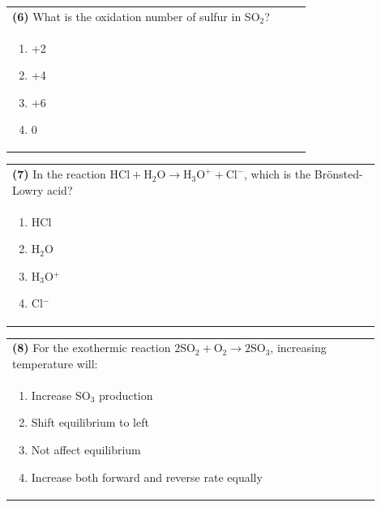 \documentclass{article}
\begin{document}
\noindent\begin{tabular}{|p{0.9\linewidth}|}
\hline
\textbf{(6)} What is the oxidation number of sulfur in SO$_2$?\\[0.2cm]
\begin{minipage}[t]{0.85\linewidth}
\begin{enumerate}[label=\alph*.]
\item +2
\item +4
\item +6
\item 0
\end{enumerate}
\end{minipage}\\[0.2cm]
\hline
\end{tabular}

\noindent\begin{tabular}{|p{0.9\linewidth}|}
\hline
\textbf{(7)} In the reaction $\text{HCl} + \text{H}_2\text{O} \rightarrow \text{H}_3\text{O}^+ + \text{Cl}^-$, which is the Brönsted-Lowry acid?\\[0.2cm]
\begin{minipage}[t]{0.85\linewidth}
\begin{enumerate}[label=\alph*.]
\item HCl
\item H$_2$O
\item H$_3$O$^+$
\item Cl$^-$
\end{enumerate}
\end{minipage}\\[0.2cm]
\hline
\end{tabular}

\noindent\begin{tabular}{|p{0.9\linewidth}|}
\hline
\textbf{(8)} For the exothermic reaction $2\text{SO}_2 + \text{O}_2 \rightarrow 2\text{SO}_3$, increasing temperature will: \\[0.2cm]
\begin{minipage}[t]{0.85\linewidth}
\begin{enumerate}[label=\alph*.]
\item Increase SO$_3$ production
\item Shift equilibrium to left
\item Not affect equilibrium
\item Increase both forward and reverse rate equally
\end{enumerate}
\end{minipage}\\[0.2cm]
\hline
\end{tabular}
\newpage
\end{document}
